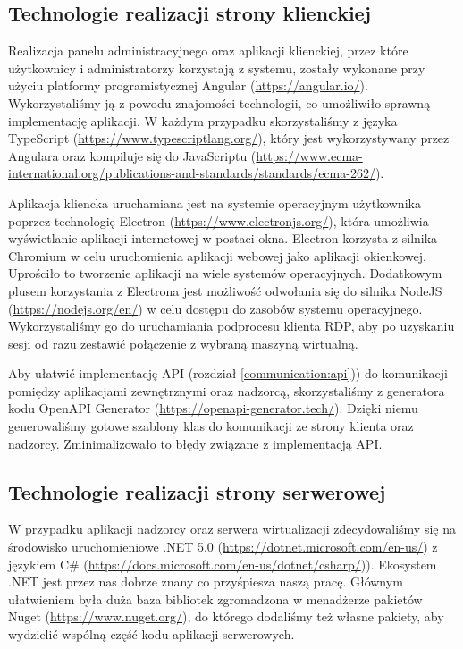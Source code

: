 \documentclass[../opis-rozwiazania.tex]{subfiles}
\begin{document}
\label{technologies}

\subsection{Technologie realizacji strony klienckiej}
Realizacja panelu administracyjnego oraz aplikacji klienckiej, przez które użytkownicy i administratorzy korzystają z systemu, zostały wykonane przy użyciu platformy programistycznej Angular (\url{https://angular.io/}).
Wykorzystaliśmy ją z powodu znajomości technologii, co umożliwiło sprawną implementację aplikacji.
W każdym przypadku skorzystaliśmy z języka TypeScript (\url{https://www.typescriptlang.org/}), który jest wykorzystywany przez Angulara oraz kompiluje się do JavaScriptu (\url{https://www.ecma-international.org/publications-and-standards/standards/ecma-262/}).

Aplikacja kliencka uruchamiana jest na systemie operacyjnym użytkownika poprzez technologię Electron (\url{https://www.electronjs.org/}), która umożliwia wyświetlanie aplikacji internetowej w postaci okna.
Electron korzysta z silnika Chromium w celu uruchomienia aplikacji webowej jako aplikacji okienkowej. Uprościło to tworzenie aplikacji na wiele systemów operacyjnych.
Dodatkowym plusem korzystania z Electrona jest możliwość odwołania się do silnika NodeJS (\url{https://nodejs.org/en/}) w celu dostępu do zasobów systemu operacyjnego.
Wykorzystaliśmy go do uruchamiania podprocesu klienta RDP, aby po uzyskaniu sesji od razu zestawić połączenie z wybraną maszyną wirtualną.

Aby ułatwić implementację API (rozdział \ref{communication:api})) do komunikacji pomiędzy aplikacjami zewnętrznymi oraz nadzorcą, skorzystaliśmy z generatora kodu OpenAPI Generator (\url{https://openapi-generator.tech/}).
Dzięki niemu generowaliśmy gotowe szablony klas do komunikacji ze strony klienta oraz nadzorcy.
Zminimalizowało to błędy związane z implementacją API.

\subsection{Technologie realizacji strony serwerowej}
W przypadku aplikacji nadzorcy oraz serwera wirtualizacji zdecydowaliśmy się na środowisko uruchomieniowe .NET 5.0 (\url{https://dotnet.microsoft.com/en-us/}) z językiem C\# (\url{https://docs.microsoft.com/en-us/dotnet/csharp/})).
Ekosystem .NET jest przez nas dobrze znany co przyśpiesza naszą pracę.
Głównym ułatwieniem była duża baza bibliotek zgromadzona w menadżerze pakietów Nuget (\url{https://www.nuget.org/}), do którego dodaliśmy też własne pakiety, aby wydzielić wspólną część kodu aplikacji serwerowych.
\end{document}
